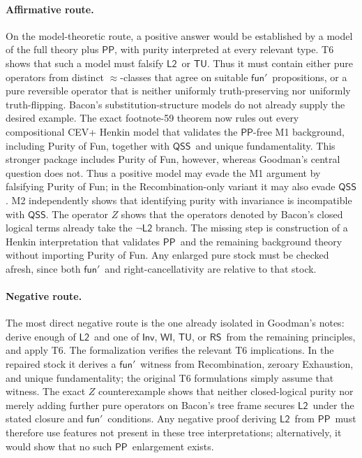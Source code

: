 \documentclass[12pt,leqno]{article}
\theoremstyle{plain}
\theoremstyle{definition}
\newcommand{\funp}{\ensuremath{\mathsf{fun}'\,}}
\newcommand{\PP}{\ensuremath{\mathsf{PP}}}
\newcommand{\Ltwo}{\ensuremath{\mathsf{L2}}}
\newcommand{\QSS}{\ensuremath{\mathsf{QSS}}}
\newcommand{\TU}{\ensuremath{\mathsf{TU}}}
\newcommand{\WI}{\ensuremath{\mathsf{WI}}}
\newcommand{\Inv}{\ensuremath{\mathsf{Inv}}}
\newcommand{\RS}{\ensuremath{\mathsf{RS}}}
\begin{document}
\paragraph{Affirmative route.}
On the model-theoretic route, a positive answer would be established by a
model of the full theory plus \PP, with purity interpreted at every relevant
type.  T6 shows that such a model must falsify
\Ltwo\ or \TU.  Thus it must contain either pure operators from distinct
\(\approx\)-classes that agree on suitable \(\funp\) propositions, or a pure
reversible operator that is neither uniformly truth-preserving nor uniformly
truth-flipping.  Bacon's substitution-structure models do not already supply
the desired example.  The exact footnote-59 theorem now rules out every
compositional CEV+ Henkin model that validates the \PP-free M1 background,
including Purity of Fun, together with \QSS\ and unique fundamentality.  This
stronger package includes Purity of Fun, however, whereas
Goodman's central question does not.  Thus a positive model may evade the M1
argument by falsifying Purity of Fun; in the Recombination-only variant it may
also evade \QSS.  M2 independently shows that identifying purity with
invariance is incompatible with \QSS.  The
operator \(Z\) shows that the operators denoted by Bacon's closed logical
terms already take the \(\neg\Ltwo\) branch.  The missing step is construction
of a Henkin interpretation that validates \PP\ and the remaining background
theory without importing Purity of Fun.  Any enlarged pure stock must be
checked afresh, since both \(\funp\) and right-cancellativity are relative to
that stock.

\paragraph{Negative route.}
The most direct negative route is the one already isolated in Goodman's
notes: derive enough of \Ltwo\ and one of \Inv, \WI, \TU, or \RS\ from the
remaining principles, and apply T6.  The formalization verifies the relevant
T6 implications.  In the repaired stock it derives a \(\funp\) witness from
Recombination, zeroary Exhaustion, and unique fundamentality; the original
T6 formulations simply assume that witness.
The exact \(Z\) counterexample shows that neither
closed-logical purity nor merely adding further pure operators on Bacon's
tree frame secures \Ltwo\ under the stated closure and \(\funp\) conditions.
Any negative proof deriving \Ltwo\ from \PP\ must therefore use features not
present in these tree interpretations; alternatively, it would show that no
such \PP\ enlargement exists.
\end{document}
